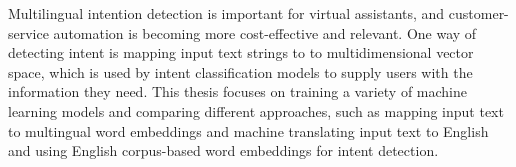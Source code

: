 Multilingual intention detection is important for virtual assistants, and customer-service automation is becoming more cost-effective and relevant. One way of detecting intent is mapping input text strings to to multidimensional vector space, which is used by intent classification models to supply users with the information they need. This thesis focuses on training a variety of machine learning models and comparing different approaches, such as mapping input text to multingual word embeddings and machine translating input text to English and using English corpus-based word embeddings for intent detection.


